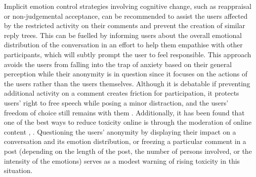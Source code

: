 \documentclass[acmtog]{acmart}
\begin{document}
Implicit emotion control strategies involving cognitive change, such as reappraisal or non-judgemental acceptance, can be recommended to assist the users affected by the restricted activity on their comments and prevent the creation of similar reply trees. This can be fuelled by informing users about the overall emotional distribution of the conversation in an effort to help them empathise with other participants, which will subtly prompt the user to feel responsible. This approach avoids the users from  falling into the trap of anxiety based on their general perception while their anonymity is in question since it focuses on the actions of the users rather than the users themselves. Although it is debatable if preventing additional activity on a comment creates friction for participation, it protects users' right to free speech while posing a minor distraction, and the users' freedom of choice still remains with them \cite{kiskola2021applying}. Additionally, it has been found that one of the best ways to reduce toxicity online is through the moderation of online content \cite{thomas2022s}, \cite{jhaver2021evaluating}. Questioning the users' anonymity by displaying their impact on a conversation and its emotion distribution, or freezing a particular comment in a post (depending on the length of the post, the number of persons involved, or the intensity of the emotions) serves as a modest warning of rising toxicity in this situation.



\end{document}
